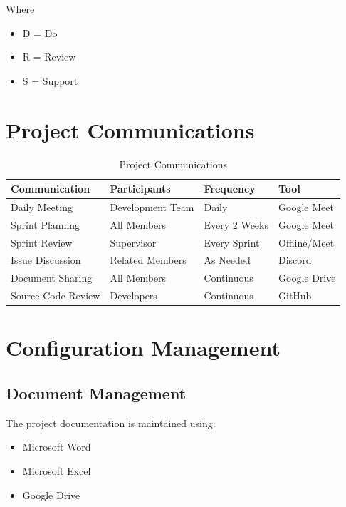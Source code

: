 Where

\begin{itemize}
\item D = Do
\item R = Review
\item S = Support
\end{itemize}


\section{Project Communications}

\begin{table}[H]
\centering
\caption{Project Communications}
\label{tab:communication}

\begin{tabular}{|p{4cm}|p{3cm}|p{3cm}|p{3cm}|}
\hline
\textbf{Communication} & \textbf{Participants} & \textbf{Frequency} & \textbf{Tool}\\
\hline
Daily Meeting & Development Team & Daily & Google Meet\\
\hline
Sprint Planning & All Members & Every 2 Weeks & Google Meet\\
\hline
Sprint Review & Supervisor & Every Sprint & Offline/Meet\\
\hline
Issue Discussion & Related Members & As Needed & Discord\\
\hline
Document Sharing & All Members & Continuous & Google Drive\\
\hline
Source Code Review & Developers & Continuous & GitHub\\
\hline
\end{tabular}
\end{table}


\section{Configuration Management}

\subsection{Document Management}

The project documentation is maintained using:

\begin{itemize}
\item Microsoft Word
\item Microsoft Excel
\item Google Drive
\end{itemize}

